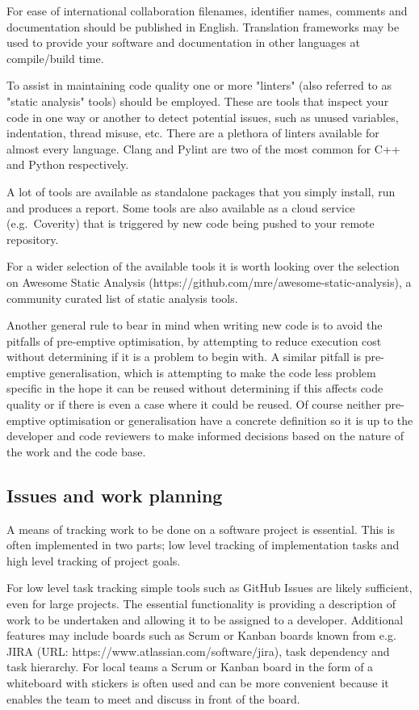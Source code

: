 \documentclass[jnr]{iosart2x}
\begin{document}
For ease of international collaboration filenames, identifier names, comments and documentation should be published in English.
Translation frameworks may be used to provide your software and documentation in other languages at compile/build time.

To assist in maintaining code quality one or more "linters" (also referred to as "static analysis" tools) should be employed.
These are tools that inspect your code in one way or another to detect potential issues, such as unused variables, indentation, thread misuse, etc.
There are a plethora of linters available for almost every language.
Clang \cite{Clang} and Pylint \cite{Pylint} are two of the most common for C++ and Python respectively.

A lot of tools are available as standalone packages that you simply install, run and produces a report.
Some tools are also available as a cloud service (e.g.\ Coverity) that is triggered by new code being pushed to your remote repository.

For a wider selection of the available tools it is worth looking over the selection on Awesome Static Analysis (https://github.com/mre/awesome-static-analysis), a community curated list of static analysis tools.

Another general rule to bear in mind when writing new code is to avoid the pitfalls of pre-emptive optimisation, by attempting to reduce execution cost without determining if it is a problem to begin with.
A similar pitfall is pre-emptive generalisation, which is attempting to make the code less problem specific in the hope it can be reused without determining if this affects code quality or if there is even a case where it could be reused.
Of course neither pre-emptive optimisation or generalisation have a concrete definition so it is up to the developer and code reviewers to make informed decisions based on the nature of the work and the code base.

\subsection{Issues and work planning}
\label{Issues and work planning}

A means of tracking work to be done on a software project is essential.
This is often implemented in two parts; low level tracking of implementation tasks and high level tracking of project goals.

For low level task tracking simple tools such as GitHub Issues are likely sufficient, even for large projects.
The essential functionality is providing a description of work to be undertaken and allowing it to be assigned to a developer.
Additional features may include boards such as Scrum or Kanban boards known from e.g.\/ JIRA (URL: https://www.atlassian.com/software/jira), task dependency and task hierarchy. For local teams a Scrum or Kanban board in the form of a whiteboard with stickers is often used and can be more convenient because it enables the team to meet and discuss in front of the board. 
\end{document}

